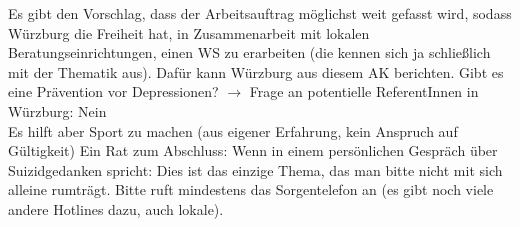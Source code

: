     Es gibt den Vorschlag, dass der Arbeitsauftrag möglichst weit gefasst wird, sodass Würzburg die Freiheit hat, in Zusammenarbeit mit lokalen Beratungseinrichtungen, einen WS zu erarbeiten (die kennen sich ja schließlich mit der Thematik aus). Dafür kann Würzburg aus diesem AK berichten.
    Gibt es eine Prävention vor Depressionen? $\rightarrow$ Frage an potentielle ReferentInnen in Würzburg: Nein \\
    Es hilft aber Sport zu machen (aus eigener Erfahrung, kein Anspruch auf Gültigkeit)
    Ein Rat zum Abschluss: Wenn in einem persönlichen Gespräch über Suizidgedanken spricht: Dies ist das einzige Thema, das man bitte nicht mit sich alleine rumträgt. Bitte ruft mindestens das Sorgentelefon an (es gibt noch viele andere Hotlines dazu, auch lokale).
